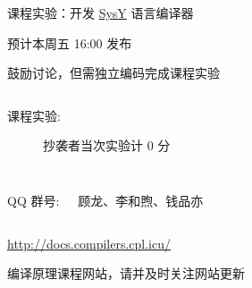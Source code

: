 \begin{frame}{}
  \begin{center}
    课程实验：开发 \href{https://compiler.educg.net/}{\textsf{SysY}} 语言编译器


    \vspace{0.30cm}
      预计本周五 16:00 发布
  \end{center}
\end{frame}

\begin{frame}
  \begin{center}
    鼓励讨论，但需独立编码完成课程实验
  \end{center}

  \begin{columns}
    \begin{description}
      \item[课程实验:] 抄袭者当次实验计 $0$ 分
    \end{description}
  \end{columns}
\end{frame}

\begin{frame}{}
  \begin{columns}
    \begin{center}
      QQ 群号: 

    \end{center}
    \begin{center}
      {\bf {}} 顾龙、李和煦、钱品亦
    \end{center}
  \end{columns}
\end{frame}

\begin{frame}{}
  \begin{center}
    \url{http://docs.compilers.cpl.icu/} \\[5pt]


    编译原理课程网站，请并及时关注网站更新
  \end{center}
\end{frame}

